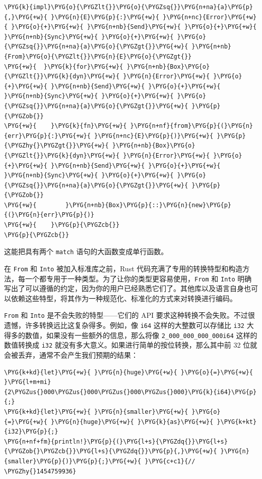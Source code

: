 \begin{Verbatim}[commandchars=\\\{\},breaklines=true,breakanywhere=true,fontsize=\codefont,xleftmargin=17bp]
\PYG{k}{impl}\PYG{o}{\PYGZlt{}}\PYG{o}{\PYGZsq{}}\PYG{n+na}{a}\PYG{p}{,}\PYG{+w}{ }\PYG{n}{E}\PYG{p}{:}\PYG{+w}{ }\PYG{n+nc}{Error}\PYG{+w}{ }\PYG{o}{+}\PYG{+w}{ }\PYG{n+nb}{Send}\PYG{+w}{ }\PYG{o}{+}\PYG{+w}{ }\PYG{n+nb}{Sync}\PYG{+w}{ }\PYG{o}{+}\PYG{+w}{ }\PYG{o}{\PYGZsq{}}\PYG{n+na}{a}\PYG{o}{\PYGZgt{}}\PYG{+w}{ }\PYG{n+nb}{From}\PYG{o}{\PYGZlt{}}\PYG{n}{E}\PYG{o}{\PYGZgt{}}
\PYG{+w}{  }\PYG{k}{for}\PYG{+w}{ }\PYG{n+nb}{Box}\PYG{o}{\PYGZlt{}}\PYG{k}{dyn}\PYG{+w}{ }\PYG{n}{Error}\PYG{+w}{ }\PYG{o}{+}\PYG{+w}{ }\PYG{n+nb}{Send}\PYG{+w}{ }\PYG{o}{+}\PYG{+w}{ }\PYG{n+nb}{Sync}\PYG{+w}{ }\PYG{o}{+}\PYG{+w}{ }\PYG{o}{\PYGZsq{}}\PYG{n+na}{a}\PYG{o}{\PYGZgt{}}\PYG{+w}{ }\PYG{p}{\PYGZob{}}
\PYG{+w}{    }\PYG{k}{fn}\PYG{+w}{ }\PYG{n+nf}{from}\PYG{p}{(}\PYG{n}{err}\PYG{p}{:}\PYG{+w}{ }\PYG{n+nc}{E}\PYG{p}{)}\PYG{+w}{ }\PYG{p}{\PYGZhy{}\PYGZgt{}}\PYG{+w}{ }\PYG{n+nb}{Box}\PYG{o}{\PYGZlt{}}\PYG{k}{dyn}\PYG{+w}{ }\PYG{n}{Error}\PYG{+w}{ }\PYG{o}{+}\PYG{+w}{ }\PYG{n+nb}{Send}\PYG{+w}{ }\PYG{o}{+}\PYG{+w}{ }\PYG{n+nb}{Sync}\PYG{+w}{ }\PYG{o}{+}\PYG{+w}{ }\PYG{o}{\PYGZsq{}}\PYG{n+na}{a}\PYG{o}{\PYGZgt{}}\PYG{+w}{ }\PYG{p}{\PYGZob{}}
\PYG{+w}{        }\PYG{n+nb}{Box}\PYG{p}{::}\PYG{n}{new}\PYG{p}{(}\PYG{n}{err}\PYG{p}{)}
\PYG{+w}{    }\PYG{p}{\PYGZcb{}}
\PYG{p}{\PYGZcb{}}
\end{Verbatim}

这能把具有两个 \texttt{match} 语句的大函数变成单行函数。

在 \texttt{From} 和 \texttt{Into} 被加入标准库之前，Rust 代码充满了专用的转换特型和构造方法，每一个都专用于一种类型。为了让你的类型更容易使用，\texttt{From} 和 \texttt{Into} 明确写出了可以遵循的约定，因为你的用户已经熟悉它们了。其他库以及语言自身也可以依赖这些特型，将其作为一种规范化、标准化的方式来对转换进行编码。

\texttt{From} 和 \texttt{Into} 是不会失败的特型——它们的 API 要求这种转换不会失败。不过很遗憾，许多转换远比这复杂得多。例如，像 \texttt{i64} 这样的大整数可以存储比 \texttt{i32} 大得多的数值，如果没有一些额外的信息，那么将像 \texttt{2\_000\_000\_000\_000i64} 这样的数值转换成 \texttt{i32} 就没有多大意义。如果进行简单的按位转换，那么其中前 32 位就会被丢弃，通常不会产生我们预期的结果：

\begin{Verbatim}[commandchars=\\\{\},breaklines=true,breakanywhere=true,fontsize=\codefont,xleftmargin=17bp]
\PYG{k+kd}{let}\PYG{+w}{ }\PYG{n}{huge}\PYG{+w}{ }\PYG{o}{=}\PYG{+w}{ }\PYG{l+m+mi}{2\PYGZus{}000\PYGZus{}000\PYGZus{}000\PYGZus{}000}\PYG{k}{i64}\PYG{p}{;}
\PYG{k+kd}{let}\PYG{+w}{ }\PYG{n}{smaller}\PYG{+w}{ }\PYG{o}{=}\PYG{+w}{ }\PYG{n}{huge}\PYG{+w}{ }\PYG{k}{as}\PYG{+w}{ }\PYG{k+kt}{i32}\PYG{p}{;}
\PYG{n+nf+fm}{println!}\PYG{p}{(}\PYG{l+s}{\PYGZdq{}}\PYG{l+s}{\PYGZob{}\PYGZcb{}}\PYG{l+s}{\PYGZdq{}}\PYG{p}{,}\PYG{+w}{ }\PYG{n}{smaller}\PYG{p}{)}\PYG{p}{;}\PYG{+w}{ }\PYG{c+c1}{// \PYGZhy{}1454759936}
\end{Verbatim}

